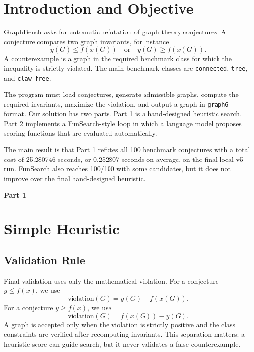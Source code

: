 \documentclass[11pt,a4paper]{article}
\begin{document}
\tableofcontents
\clearpage

\section{Introduction and Objective}

GraphBench asks for automatic refutation of graph theory conjectures. A conjecture compares two graph invariants, for instance
\[
  y(G) \le f(x(G)) \quad \text{or} \quad y(G) \ge f(x(G)).
\]
A counterexample is a graph in the required benchmark class for which the inequality is strictly violated. The main benchmark classes are \texttt{connected}, \texttt{tree}, and \texttt{claw\_free}.

The program must load conjectures, generate admissible graphs, compute the required invariants, maximize the violation, and output a graph in \texttt{graph6} format. Our solution has two parts. Part 1 is a hand-designed heuristic search. Part 2 implements a FunSearch-style loop in which a language model proposes scoring functions that are evaluated automatically.

The main result is that Part 1 refutes all 100 benchmark conjectures with a total cost of 25.280746 seconds, or 0.252807 seconds on average, on the final local v5 run. FunSearch also reaches 100/100 with some candidates, but it does not improve over the final hand-designed heuristic.

\clearpage
\begin{center}
  {\LARGE\bfseries Part 1}
\end{center}
\vspace{0.6em}

\section{Simple Heuristic}

\subsection{Validation Rule}

Final validation uses only the mathematical violation. For a conjecture \(y \le f(x)\), we use
\[
  \text{violation}(G)=y(G)-f(x(G)).
\]
For a conjecture \(y \ge f(x)\), we use
\[
  \text{violation}(G)=f(x(G))-y(G).
\]
A graph is accepted only when the violation is strictly positive and the class constraints are verified after recomputing invariants. This separation matters: a heuristic score can guide search, but it never validates a false counterexample.
\end{document}
